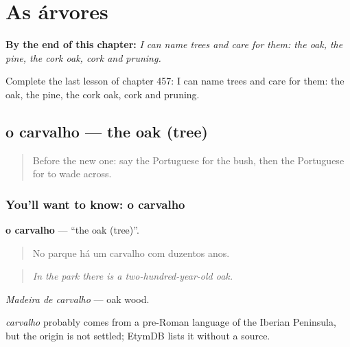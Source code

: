 
\chapter{As árvores}
\label{ch:pt-as-arvores}

\begin{chapteropening}
\textbf{By the end of this chapter:} \emph{I can name trees and care for them: the oak, the pine, the cork oak, cork and pruning.}

Complete the last lesson of chapter 457: I can name trees and care for them: the oak, the pine, the cork oak, cork and pruning.
\end{chapteropening}

\section[o carvalho]{o carvalho — the oak (tree)}

\label{lesson:PT-C457-carvalho}



\begin{quote}
Before the new one: say the Portuguese for the bush, then the Portuguese for to wade across.
\end{quote}

\subsection*{You'll want to know: o carvalho}
\textbf{o carvalho} — \textquotedblleft{}the oak (tree)\textquotedblright{}.

\begin{quote}
No parque há um carvalho com duzentos anos.
\end{quote}

\begin{quote}
\emph{In the park there is a two-hundred-year-old oak.}
\end{quote}

\emph{Madeira de carvalho} — oak wood.

\begin{cousinweb}
\emph{carvalho} probably comes from a pre-Roman language of the Iberian Peninsula, but the origin is not settled; EtymDB lists it without a source.
\end{cousinweb}

